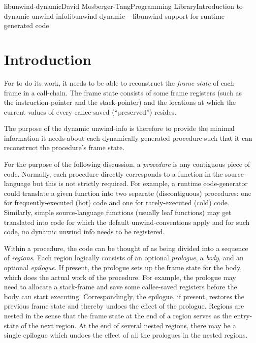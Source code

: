 \documentclass{article}
\begin{document}
\begin{Name}{3}{libunwind-dynamic}{David Mosberger-Tang}{Programming Library}{Introduction to dynamic unwind-info}libunwind-dynamic -- libunwind-support for runtime-generated code
\end{Name}

\section{Introduction}

For  to do its work, it needs to be able to
reconstruct the \emph{frame state} of each frame in a call-chain.  The
frame state consists of some frame registers (such as the
instruction-pointer and the stack-pointer) and the locations at which
the current values of every callee-saved (``preserved'') resides.

The purpose of the dynamic unwind-info is therefore to provide
 the minimal information it needs about each
dynamically generated procedure such that it can reconstruct the
procedure's frame state.

For the purpose of the following discussion, a \emph{procedure} is any
contiguous piece of code.  Normally, each procedure directly
corresponds to a function in the source-language but this is not
strictly required.  For example, a runtime code-generator could
translate a given function into two separate (discontiguous)
procedures: one for frequently-executed (hot) code and one for
rarely-executed (cold) code.  Similarly, simple source-language
functions (usually leaf functions) may get translated into code for
which the default unwind-conventions apply and for such code, no
dynamic unwind info needs to be registered.

Within a procedure, the code can be thought of as being divided into a
sequence of \emph{regions}.  Each region logically consists of an
optional \emph{prologue}, a \emph{body}, and an optional
\emph{epilogue}.  If present, the prologue sets up the frame state for
the body, which does the actual work of the procedure.  For example,
the prologue may need to allocate a stack-frame and save some
callee-saved registers before the body can start executing.
Correspondingly, the epilogue, if present, restores the previous frame
state and thereby undoes the effect of the prologue.  Regions are
nested in the sense that the frame state at the end of a region serves
as the entry-state of the next region.  At the end of several nested
regions, there may be a single epilogue which undoes the effect of all
the prologues in the nested regions.
\end{document}
